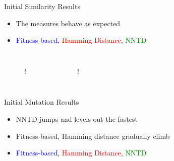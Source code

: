 \begin{frame}{Initial Similarity Results}
  \begin{itemize}
    \item The measures behave as expected
    \item \textcolor{blue}{Fitness-based}, \textcolor{red}{Hamming Distance}, \textcolor{green}{NNTD}
  \end{itemize}

  \begin{columns}
    \begin{figure}[t!]
      \centering
      \resizebox{\linewidth} {!} {%
        
      }
    \end{figure}
    \begin{figure}
      \centering
      \resizebox{\linewidth} {!} {%
        
      }
    \end{figure}
  \end{columns}

\end{frame}


\begin{frame}{Initial Mutation Results}
  \begin{itemize}
    \item NNTD jumps and levels out the fastest
    \item Fitness-based, Hamming distance gradually climb
    \item \textcolor{blue}{Fitness-based}, \textcolor{red}{Hamming Distance}, \textcolor{green}{NNTD}
  \end{itemize}

  \begin{columns}
    \begin{figure}
      \centering
    \end{figure}
    \begin{figure}
      \centering
    \end{figure}
  \end{columns}
\end{frame}



